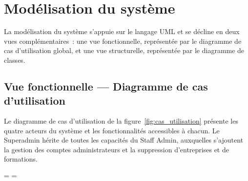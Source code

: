 \section{Modélisation du système}

La modélisation du système s'appuie sur le langage UML et se décline en deux vues
complémentaires~: une vue fonctionnelle, représentée par le diagramme de cas
d'utilisation global, et une vue structurelle, représentée par le diagramme de classes.

\subsection{Vue fonctionnelle --- Diagramme de cas d'utilisation}

Le diagramme de cas d'utilisation de la figure~\ref{fig:cas_utilisation} présente les
quatre acteurs du système et les fonctionnalités accessibles à chacun. Le Superadmin
hérite de toutes les capacités du Staff Admin, auxquelles s'ajoutent la gestion des
comptes administrateurs et la suppression d'entreprises et de formations.

\clearpage
\begingroup


\setlength{\paperwidth}{297mm}
\setlength{\paperheight}{420mm}
\pdfpagewidth=\paperwidth
\pdfpageheight=\paperheight


\setlength{\textwidth}{267mm}
\setlength{\textheight}{370mm}

\makeatletter
\setlength{\@colht}{\textheight}
\setlength{\@colroom}{\textheight}
\setlength{\vsize}{\textheight}
\makeatother


\setlength{\hoffset}{0mm}
\setlength{\oddsidemargin}{-10.4mm}
\setlength{\evensidemargin}{-10.4mm}


